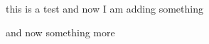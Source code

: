 \documentclass{article}
\begin{document}
this is a test
and now I am adding something


and now something more
\end{document}
